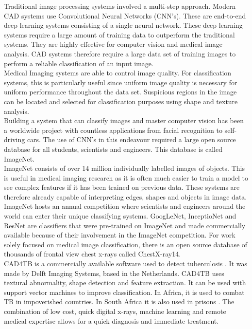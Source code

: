 Traditional image processing systems involved a multi-step approach. Modern CAD systems use Convolutional Neural Networks (CNN’s). These are end-to-end deep learning systems consisting of a single neural network. These deep learning systems require a large amount of training data to outperform the traditional systems\cite{4}. They are highly effective for computer vision and medical image analysis. CAD systems therefore require a large data set of training images to perform a reliable classification of an input image.\newline
\\
Medical Imaging systems are able to control image quality. For classification systems, this is particularly useful since uniform image quality is necessary for uniform performance throughout the data set. Suspicious regions in the image can be located and selected for classification purposes using shape and texture analysis.\newline
\\
 Building a system that can classify images and master computer vision has been a worldwide project with countless applications from facial recognition to self-driving cars. The use of CNN's in this endeavour required a large open source database for all students, scientists and engineers. This database is called ImageNet.\newline
 \\
ImageNet consists of over 14 million individually labelled images of objects. This is useful in medical imaging research as it is often much easier to train a model to see complex features if it has been trained on previous data. These systems are therefore already capable of interpreting edges, shapes and objects in image data.\newline
\\
ImageNet hosts an annual competition where scientists and engineers around the world can enter their unique classifying systems. GoogLeNet, InceptioNet and ResNet are classifiers that were pre-trained on ImageNet and made commercially available because of their involvement in the ImageNet competition. For work solely focused on medical image classification, there is an open source database of thousands of frontal view chest x-rays called ChestX-ray14. \newline
\\
CAD4TB is a commercially available software used to detect tuberculosis \cite{3}. It was made by Delft Imaging Systems, based in the Netherlands. CAD4TB uses textural abnormality, shape detection and feature extraction. It can be used with support vector machines to improve classification. In Africa, it is used to combat TB in impoverished countries. In South Africa it is also used in prisons \cite{5}. The combination of low cost, quick digital x-rays, machine learning and remote medical expertise allows for a quick diagnosis and immediate treatment.\newline
